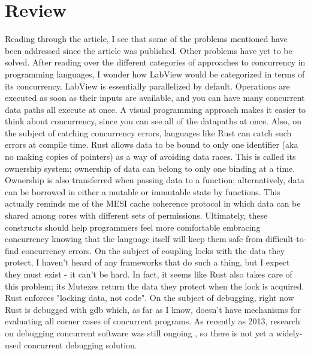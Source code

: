 \documentclass{article}
\begin{document}
\section*{Review}
Reading through the article, I see that some of the problems mentioned have been addressed since the article was published. Other problems have yet to be solved. After reading over the different categories of approaches to concurrency in programming languages, I wonder how LabView would be categorized in terms of its concurrency. LabView is essentially parallelized by default. Operations are executed as soon as their inputs are available, and you can have many concurrent data paths all execute at once. A visual programming approach makes it easier to think about concurrency, since you can see all of the datapaths at once. Also, on the subject of catching concurrency errors, languages like Rust can catch such errors at compile time. Rust allows data to be bound to only one identifier (aka no making copies of pointers) as a way of avoiding data races. This is called its ownership system; ownership of data can belong to only one binding at a time. Ownership is also transferred when passing data to a function; alternatively, data can be borrowed in either a mutable or immutable state by functions. This actually reminds me of the MESI cache coherence protocol in which data can be shared among cores with different sets of permissions. Ultimately, these constructs should help programmers feel more comfortable embracing concurrency knowing that the language itself will keep them safe from difficult-to-find concurrency errors. On the subject of coupling locks with the data they protect, I haven't heard of any frameworks that do such a thing, but I expect they must exist - it can't be hard. In fact, it seems like Rust also takes care of this problem; its Mutexes return the data they protect when the lock is acquired. Rust enforces "locking data, not code". On the subject of debugging, right now Rust is debugged with gdb which, as far as I know, doesn't have mechanisms for evaluating all corner cases of concurrent programs. As recently as 2013, research on debugging concurrent software was still ongoing \cite{Huang:2013}, so there is not yet a widely-used concurrent debugging solution.
\end{document}
